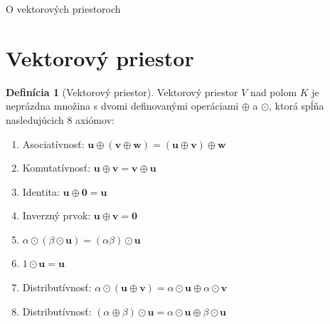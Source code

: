 \documentclass[a4paper, 10pt, ]{article}
\newcommand{\bm}[1]{\mathbf{#1}}
\theoremstyle{definition}
\newtheorem{definition}{Definícia}[section]
\begin{document}
\begin{flushleft}
	O vektorových priestoroch
\end{flushleft}

\bigskip

\normalsize
\normalfont

\section{Vektorový priestor}
\label{VectorSpace}

\begin{definition}[Vektorový priestor]
	Vektorový priestor $V$ nad polom $K$ je neprázdna množina s dvomi definovanými operáciami $\oplus$ a $\odot$, ktorá spĺňa nasledujúcich 8 axiómov:
	\begin{enumerate}
		\item Asociatívnosť: $\bm{u} \oplus (\bm{v} \oplus \bm{w}) = (\bm{u} \oplus \bm{v}) \oplus \bm{w} $
		\item Komutatívnosť: $\bm{u} \oplus \bm{v} = \bm{v} \oplus \bm{u} $
		\item Identita: $\bm{u} \oplus \bm{0} = \bm{u}$
		\item Inverzný prvok: $\bm{u} \oplus \bm{v} = \bm{0}$
		\item $\alpha \odot (\beta \odot \bm{u}) = (\alpha \beta) \odot \bm{u}$
		\item $1 \odot \bm{u} = \bm{u}$
		\item Distributívnosť: $\alpha \odot (\bm{u} \oplus \bm{v}) = \alpha \odot \bm{u} \oplus \alpha \odot \bm{v}$
		\item Distributívnosť: $(\alpha \oplus \beta) \odot \bm{u} = \alpha \odot \bm{u} \oplus \beta \odot \bm{u}$
	\end{enumerate}
    
\end{definition}
\end{document}
